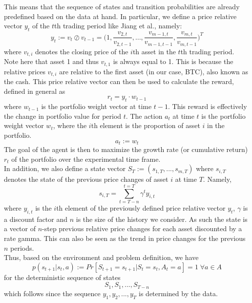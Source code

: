 \documentclass[a4paper,12pt]{article}
\begin{document}
This means that the sequence of states and transition probabilities are already predefined based on the data at hand. In particular, we define a price relative vector $y_t$ of the $t$th trading period like Jiang et al., namely:
\begin{equation}
y_t := v_t \oslash v_{t-1} = \bigg(1,\frac{v_{2,t}}{v_{2,t-1}}, …,\frac{v_{m-1,t}}{v_{m-1,t-1}}, \frac{v_{m,t}}{v_{m,t-1}}\bigg)^T
\end{equation}
where $v_{t,i}$ denotes the closing price of the $i$th asset in the $t$th trading period. Note here that asset 1 and thus $v_{t,1}$ is always equal to 1. This is because the relative prices $v_{t,i}$ are relative to the first asset (in our case, BTC), also known as the cash. This price relative vector can then be used to calculate the reward, defined in general as 
\begin{equation}
r_t = y_t \cdot w_{t-1}
\end{equation}
where $w_{t-1}$ is the portfolio weight vector at time $t-1$. This reward is effectively the change in portfolio value for period $t$. The action $a_t$ at time $t$ is the portfolio weight vector $w_t$, where the $i$th element is the proportion of asset $i$ in the portfolio.
\begin{equation}
a_t := w_t
\end{equation}
The goal of the agent is then to maximize the growth rate (or cumulative return) $r_t$ of the portfolio over the experimental time frame. \\

In addition, we also define a state vector $S_T := (s_{1,T},...,s_{m,T})$ where $s_{i,T}$ denotes the state of the previous price changes of asset $i$ at time $T$. Namely,
\begin{equation}
s_{i,T} = \sum_{t=T-n}^{t=T} \gamma^t y_{i,t}
\end{equation}
where $y_{i,t}$ is the $i$th element of the previously defined price relative vector $y_t$, $\gamma$ is a discount factor and $n$ is the size of the history we consider. As such the state is a vector of $n$-step previous relative price changes for each asset discounted by a rate gamma. This can also be seen as the trend in price changes for the previous $n$ periods. \\

Thus, based on the environment and problem definition, we have 
\begin{equation}
p(s_{t+1} | s_t,a) := Pr[S_{t+1}=s_{t+1} | S_t=s_t,A_t=a] = 1 \; \forall a \in A
\end{equation}
for the deterministic sequence of states
$$S_1,S_1,...,S_{T-n}$$
which follows since the sequence $y_1,y_2,...,y_T$ is determined by the data. \\
\end{document}
